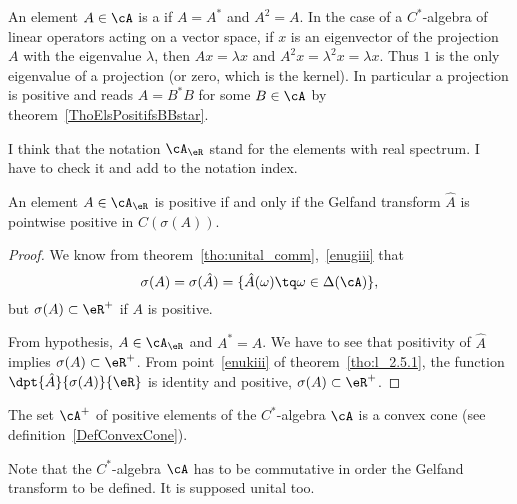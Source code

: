 An element $A\in\cA$ is a  if $A=A^*$ and $A^2=A$. In the case of a $C^*$-algebra of linear operators acting on a vector space, if $x$ is an eigenvector of the projection $A$ with the eigenvalue $\lambda$, then $Ax=\lambda x$ and $A^2x=\lambda^2x=\lambda x$. Thus $1$ is the only eigenvalue of a projection (or zero, which is the kernel). In particular a projection is positive and reads\label{PgProjPositif} $A=B^*B$ for some $B\in \cA$ by theorem~\ref{ThoElsPositifsBBstar}.

\begin{probleme}
    I think that the notation \(\cA_{\eR}\) stand for the elements with real spectrum. I have to check it and add to the notation index.
\end{probleme}

\begin{proposition}
An element $A\in\cA_{\eR}$ is positive if and only if the Gelfand transform $\hat A$ is pointwise positive in $C(\sigma(A))$.
\end{proposition}

\begin{proof}
We know from theorem~\ref{tho:unital_comm},~\ref{enugiii} that
\[
  \sigma(A)=\sigma(\hat A)=\{ \hat A(\omega)\tq\omega\in\Delta(\cA) \},
\]
but $\sigma(A)\subset\eR^+$ if $A$ is positive.

From hypothesis, $A\in\cA_{\eR}$ and $A^*=A$. We have to see that positivity of $\hat A$ implies $\sigma(A)\subset\eR^+$. From point~\ref{enukiii} of theorem~\ref{tho:l_2.5.1}, the function $\dpt{\hat A}{\sigma(A)}{\eR}$ is identity and positive, $\sigma(A)\subset\eR^+$.

\end{proof}


\begin{proposition}     \label{PropAplusConvexCone}
    The set $\cA^+$ of positive elements of the $C^*$-algebra $\cA$ is a convex cone (see definition~\ref{DefConvexCone}).
\end{proposition}

Note that the $C^*$-algebra $\cA$ has to be commutative in order the Gelfand transform to be defined. It is supposed unital too.

